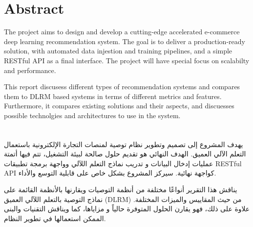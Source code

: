 \cleardoublepage {} {} \mtcaddchapter
\chapter*{Abstract}
The project aims to design and develop a cutting-edge accelerated  e-commerce deep learning recommendation system. The goal is to deliver a production-ready solution, with automated data injestion and training pipelines, and a simple RESTful API as a final interface. The project will have special focus on scalabilty and performance.

This report discusess different types of recommendation systems and compares them to DLRM based systems in terms of different metrics and features. Furthermore, it compares existing solutions and their aspects, and discuesses possible technolgies and architectures to use in the system.
\cleardoublepage {} {} \mtcaddchapter
\chapter*{}
\begin{RLtext}
يهدف المشروع إلى تصميم وتطوير نظام توصية لمنصات التجارة الإلكترونية باستعمال التعلم الآلي العميق. الهدف النهائي هو تقديم حلول صالحة لبيئة التشغيل، تتم فيها أتمتة عمليات إدخال البيانات و تدريب نماذج التعلم اللآلي وواجهة برمجة تطبيقات RESTful API كواجهة نهائية. سيركز المشروع بشكل خاص على قابلية التوسع والأداء.

يناقش هذا التقرير أنواعًا مختلفة من أنظمة التوصيات ويقارنها بالأنظمة القائمة على نماذج التوصية بالتعلم اللآلي العميق (DLRM) من حيث المقاييس والميزات المختلفة. علاوة على ذلك، فهو يقارن الحلول المتوفرة حالياً و مزاياها، كما ويناقش التقنيات والبنى الممكن استعمالها في تطوير النظام.
\end{RLtext}

\justifying